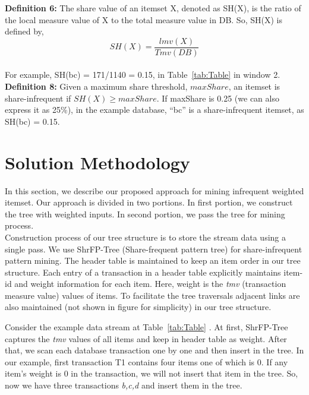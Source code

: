 \textbf{Definition 6:} The share value of an itemset X, denoted as SH(X), is the ratio of the local measure value of X to the total measure value in DB. So, SH(X) is defined by,
\begin{equation}
SH(X) = \frac{lmv(X)}{Tmv(DB)}
\end{equation}
\\For example, SH(bc) = 171/1140 = 0.15, in Table~\ref{tab:Table} in window 2.\\
\textbf{Definition 8:} Given a maximum share threshold, $maxShare$, an itemset is share-infrequent if $SH(X) \ge maxShare$. If maxShare is 0.25 (we can also express it as 25\%), in the example database, “bc” is a share-infrequent itemset, as SH(bc) = 0.15. \\

\section{Solution Methodology}
%
In this section, we describe our proposed approach for mining infrequent weighted itemset. Our approach is divided in two portions. In first portion, we construct the tree with weighted inputs. 
In second portion, we pass the tree for mining process.\\
Construction process of our tree structure is to store the stream data using a single pass. We use ShrFP-Tree (Share-frequent pattern tree) for share-infrequent pattern mining. The header table 
is maintained to keep an item order in our tree structure. Each entry of a transaction in a header table  explicitly maintains item-id and weight information for each item. Here, 
weight is the {\it tmv} (transaction measure value) values of items. To facilitate the tree traversals adjacent links are also maintained (not shown in figure for simplicity) in our tree structure.
%
\par Consider the example data stream at Table~\ref{tab:Table} . At first, ShrFP-Tree captures the {\it tmv} values of all items and keep in header table  as weight. After that, 
we scan each database transaction one by one and then insert in the tree. In our example, first transaction T1 contains four items one of which is 0. If any item’s weight is 0 in the transaction, 
we will not insert that item in the tree. So, now we have three transactions {\it b,c,d} and insert them in the tree.\\

